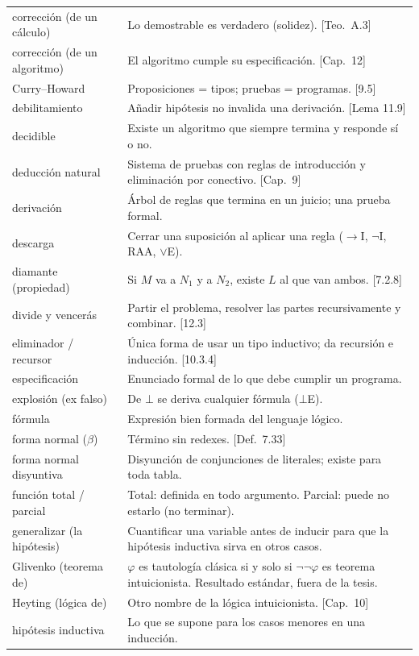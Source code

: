 \documentclass[11pt,a4paper]{article}
\begin{document}
{\begin{longtable}{@{}p{}p{}@{}}
corrección (de un cálculo) & Lo demostrable es verdadero (solidez). [Teo.\ A.3]\\
corrección (de un algoritmo) & El algoritmo cumple su especificación. [Cap.\ 12]\\
Curry--Howard & Proposiciones = tipos; pruebas = programas. [9.5]\\
debilitamiento & Añadir hipótesis no invalida una derivación. [Lema 11.9]\\
decidible & Existe un algoritmo que siempre termina y responde sí o no.\\
deducción natural & Sistema de pruebas con reglas de introducción y eliminación por conectivo. [Cap.\ 9]\\
derivación & Árbol de reglas que termina en un juicio; una prueba formal.\\
descarga & Cerrar una suposición al aplicar una regla (\(\to\)I, \(\neg\)I, RAA, \(\vee\)E).\\
diamante (propiedad) & Si \(M\) va a \(N_1\) y a \(N_2\), existe \(L\) al que van ambos. [7.2.8]\\
divide y vencerás & Partir el problema, resolver las partes recursivamente y combinar. [12.3]\\
eliminador / recursor & Única forma de usar un tipo inductivo; da recursión e inducción. [10.3.4]\\
especificación & Enunciado formal de lo que debe cumplir un programa.\\
explosión (ex falso) & De \(\bot\) se deriva cualquier fórmula (\(\bot\)E).\\
fórmula & Expresión bien formada del lenguaje lógico.\\
forma normal (\(\beta\)) & Término sin redexes. [Def.\ 7.33]\\
forma normal disyuntiva & Disyunción de conjunciones de literales; existe para toda tabla.\\
función total / parcial & Total: definida en todo argumento. Parcial: puede no estarlo (no terminar).\\
generalizar (la hipótesis) & Cuantificar una variable antes de inducir para que la hipótesis inductiva sirva en otros casos.\\
Glivenko (teorema de) & \(\varphi\) es tautología clásica si y solo si \(\neg\neg\varphi\) es teorema intuicionista. Resultado estándar, fuera de la tesis.\\
Heyting (lógica de) & Otro nombre de la lógica intuicionista. [Cap.\ 10]\\
hipótesis inductiva & Lo que se supone para los casos menores en una inducción.\\

\end{longtable}}
\end{document}

